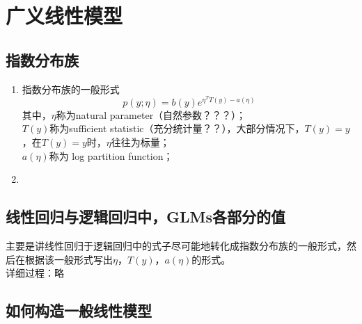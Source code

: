 \section{广义线性模型}
\subsection{指数分布族}
\begin{enumerate}
	\item 指数分布族的一般形式
	\begin{equation}
		p(y;\eta) = b(y)e^{\eta^T T(y) - a(\eta)}
	\end{equation}
	其中，$\eta$称为natural parameter（自然参数？？？）； \\
	$T(y)$称为sufficient statistic（充分统计量？？），大部分情况下，$T(y) = y$，在$T(y)=y$时，$\eta$往往为标量； \\
	$a(\eta)$称为 log partition function；
	\item 
\end{enumerate}

\subsection{线性回归与逻辑回归中，GLMs各部分的值}
主要是讲线性回归于逻辑回归中的式子尽可能地转化成指数分布族的一般形式，然后在根据该一般形式写出$\eta$，$T(y)$，$a(\eta)$的形式。\\
详细过程：略

\subsection{如何构造一般线性模型}



























